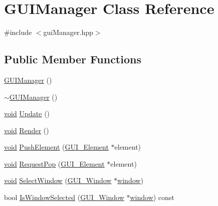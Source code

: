 \hypertarget{class_g_u_i_manager}{\section{G\-U\-I\-Manager Class Reference}
\label{class_g_u_i_manager}
}


{\ttfamily \#include $<$gui\-Manager.\-hpp$>$}

\subsection*{Public Member Functions}
\begin{DoxyCompactItemize}
\item 
\hyperlink{class_g_u_i_manager_a5587062fc64af58b9adbe5df4ba25097}{G\-U\-I\-Manager} ()
\item 
\hyperlink{class_g_u_i_manager_a4e1a7873e94f406c1b6cb4c50d3f2aab}{$\sim$\-G\-U\-I\-Manager} ()
\item 
\hyperlink{_s_d_l__opengles2__gl2ext_8h_ae5d8fa23ad07c48bb609509eae494c95}{void} \hyperlink{class_g_u_i_manager_ab13b8c243a5950575c42674365558bcc}{Update} ()
\item 
\hyperlink{_s_d_l__opengles2__gl2ext_8h_ae5d8fa23ad07c48bb609509eae494c95}{void} \hyperlink{class_g_u_i_manager_a33fff41b6ac48ca99233c59304869bf6}{Render} ()
\item 
\hyperlink{_s_d_l__opengles2__gl2ext_8h_ae5d8fa23ad07c48bb609509eae494c95}{void} \hyperlink{class_g_u_i_manager_a475af471c47fc35b54dd73f38aa7ea6c}{Push\-Element} (\hyperlink{class_g_u_i___element}{G\-U\-I\-\_\-\-Element} $\ast$element)
\item 
\hyperlink{_s_d_l__opengles2__gl2ext_8h_ae5d8fa23ad07c48bb609509eae494c95}{void} \hyperlink{class_g_u_i_manager_a66d3a697ee17d8261174dd22fd784b48}{Request\-Pop} (\hyperlink{class_g_u_i___element}{G\-U\-I\-\_\-\-Element} $\ast$element)
\item 
\hyperlink{_s_d_l__opengles2__gl2ext_8h_ae5d8fa23ad07c48bb609509eae494c95}{void} \hyperlink{class_g_u_i_manager_a951b31fcd1e6c5e9fcc39393e411c52c}{Select\-Window} (\hyperlink{class_g_u_i___window}{G\-U\-I\-\_\-\-Window} $\ast$\hyperlink{jquery_8js_a04a8a2bbfa9c15500892b8e5033d625b}{window})
\item 
bool \hyperlink{class_g_u_i_manager_aee22bffcd6ac8a8022e304845f41a110}{Is\-Window\-Selected} (\hyperlink{class_g_u_i___window}{G\-U\-I\-\_\-\-Window} $\ast$\hyperlink{jquery_8js_a04a8a2bbfa9c15500892b8e5033d625b}{window}) const 
\item 

\end{DoxyCompactItemize}
